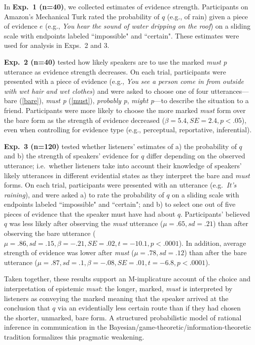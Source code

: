 \documentclass[11pt]{article}
\begin{document}
In \textbf{Exp.~1 (n=40)}, we collected estimates of evidence strength. Participants on Amazon's Mechanical Turk rated the probability of $q$ (e.g., of rain) given a piece of evidence $e$ (e.g., \textit{You hear the sound of water dripping on the roof}) on a sliding scale with endpoints labeled ``impossible" and ``certain". These estimates were used for analysis in Exps.~2 and 3.

\textbf{Exp.~2 (n=40)} tested how likely speakers are to use the marked \emph{must p} utterance as evidence strength decreases. On each trial, participants were presented with a piece of evidence (e.g., \textit{You see a person come in from outside with wet hair and wet clothes}) and were asked to choose one of four utterances---bare (\ref{bare}), \textit{must p} (\ref{must}), \textit{probably p}, \textit{might p}---to describe the situation to a friend. Participants were more likely to choose the more marked \textit{must} form over the bare form as the strength of evidence decreased ($\beta=5.4, SE=2.4, p<.05$), even when controlling for evidence type (e.g., perceptual, reportative, inferential).

\textbf{Exp.~3 (n=120)} tested {whether listeners' estimates of a) the probability of $q$ and b) the strength of speakers' evidence for $q$ differ depending on the observed utterance}; i.e.~whether listeners take into account their knowledge of speakers' likely utterances in different evidential states as they interpret the bare and \textit{must} forms. On each trial, participants were presented with an utterance (e.g.~\textit{It's raining}), and were asked a) to rate the probability of $q$ on a sliding scale with endpoints labeled ``impossible" and ``certain"; and b) to select one out of five pieces of evidence that the speaker must have had about $q$. Participants' believed $q$ was less likely after observing the \textit{must} utterance ($\mu=.65,sd=.21$) than after observing the bare utterance ($\mu=.86,sd=.15, \beta=-.21, SE=.02, t=-10.1, p<.0001$). In addition, average strength of evidence was lower after \textit{must} ($\mu=.78,sd=.12$) than after the bare utterance ($\mu=.87,sd=.1, \beta=-.08, SE=.01, t=-6.8, p<.0001$).

Taken together, these results support an M-implicature account of the choice and interpretation of epistemic \textit{must}: the longer, marked, \textit{must} is interpreted by listeners as conveying the marked meaning that the speaker arrived at the conclusion that $q$ via an evidentially less certain route than if they had chosen the shorter, unmarked, bare form. A structured probabilistic model of rational inference in communication in the Bayesian/game-theoretic/information-theoretic tradition \cite{franke, goodman, levy, jaeger} formalizes this pragmatic weakening.
\end{document}
